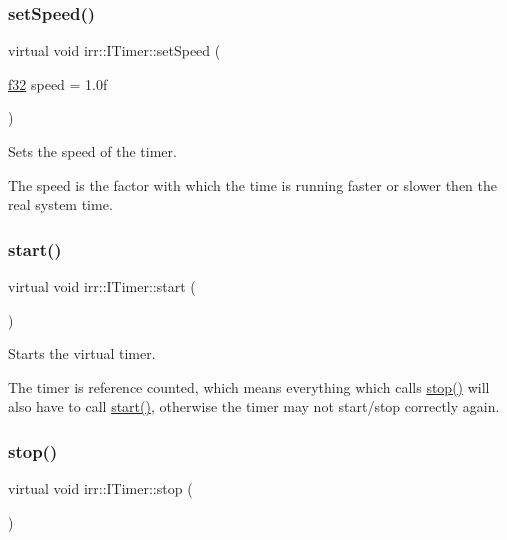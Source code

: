 \subsubsection{\texorpdfstring{set\+Speed()}{setSpeed()}}
{\footnotesize\ttfamily virtual void irr\+::\+I\+Timer\+::set\+Speed (\begin{DoxyParamCaption}\item[{\hyperlink{namespaceirr_a0277be98d67dc26ff93b1a6a1d086b07}{f32}}]{speed = {\ttfamily 1.0f} }\end{DoxyParamCaption})\hspace{0.3cm}{\ttfamily [pure virtual]}}



Sets the speed of the timer. 

The speed is the factor with which the time is running faster or slower then the real system time. \mbox{\label{classirr_1_1ITimer_a9467dc5a72de3869712715d0473c9697}} 
\subsubsection{\texorpdfstring{start()}{start()}}
{\footnotesize\ttfamily virtual void irr\+::\+I\+Timer\+::start (\begin{DoxyParamCaption}{ }\end{DoxyParamCaption})\hspace{0.3cm}{\ttfamily [pure virtual]}}



Starts the virtual timer. 

The timer is reference counted, which means everything which calls \hyperlink{classirr_1_1ITimer_a649e7294fafc6e6de00f9a4dc6894c16}{stop()} will also have to call \hyperlink{classirr_1_1ITimer_a9467dc5a72de3869712715d0473c9697}{start()}, otherwise the timer may not start/stop correctly again. \mbox{\label{classirr_1_1ITimer_a649e7294fafc6e6de00f9a4dc6894c16}} 
\subsubsection{\texorpdfstring{stop()}{stop()}}
{\footnotesize\ttfamily virtual void irr\+::\+I\+Timer\+::stop (\begin{DoxyParamCaption}{ }\end{DoxyParamCaption})\hspace{0.3cm}{\ttfamily [pure virtual]}}



